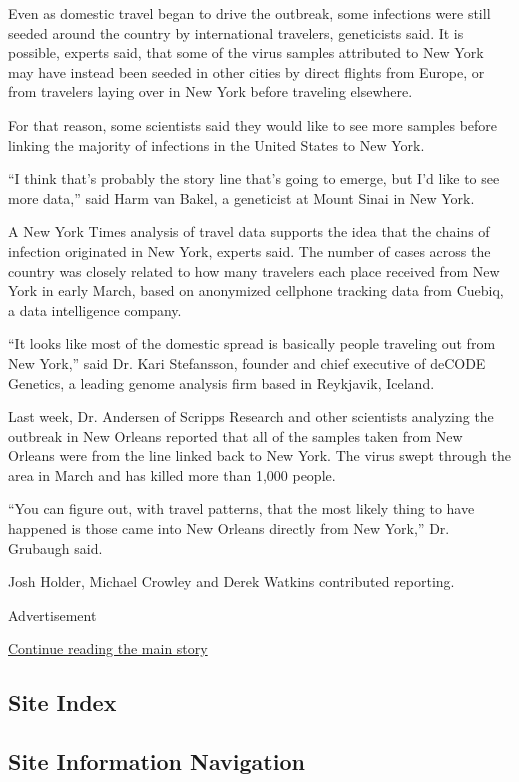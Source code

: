 Even as domestic travel began to drive the outbreak, some infections
were still seeded around the country by international travelers,
geneticists said. It is possible, experts said, that some of the virus
samples attributed to New York may have instead been seeded in other
cities by direct flights from Europe, or from travelers laying over in
New York before traveling elsewhere.

For that reason, some scientists said they would like to see more
samples before linking the majority of infections in the United States
to New York.

``I think that's probably the story line that's going to emerge, but I'd
like to see more data,'' said Harm van Bakel, a geneticist at Mount
Sinai in New York.

A New York Times analysis of travel data supports the idea that the
chains of infection originated in New York, experts said. The number of
cases across the country was closely related to how many travelers each
place received from New York in early March, based on anonymized
cellphone tracking data from Cuebiq, a data intelligence company.

``It looks like most of the domestic spread is basically people
traveling out from New York,'' said Dr. Kari Stefansson, founder and
chief executive of deCODE Genetics, a leading genome analysis firm based
in Reykjavik, Iceland.

Last week, Dr. Andersen of Scripps Research and other scientists
analyzing the outbreak in New Orleans reported that all of the samples
taken from New Orleans were from the line linked back to New York. The
virus swept through the area in March and has killed more than 1,000
people.

``You can figure out, with travel patterns, that the most likely thing
to have happened is those came into New Orleans directly from New
York,'' Dr. Grubaugh said.

Josh Holder, Michael Crowley and Derek Watkins contributed reporting.

Advertisement

\protect\hyperlink{after-bottom}{Continue reading the main story}

\hypertarget{site-index}{%
\subsection{Site Index}\label{site-index}}

\hypertarget{site-information-navigation}{%
\subsection{Site Information
Navigation}\label{site-information-navigation}}

